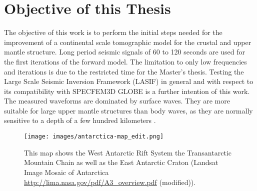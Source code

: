 \section{Objective of this Thesis} %

The objective of this work is to perform the initial steps needed for the improvement of a continental scale tomographic model for the crustal and upper mantle structure.
Long period seismic signals of 60 to 120 seconds %
are used for the first iterations of the forward model. 
The limitation to only low frequencies and %
iterations is due to the restricted time for the Master's thesis.
Testing the Large Scale Seismic Inversion Framework (LASIF) in general and with respect to its compatibility with SPECFEM3D 
GLOBE is a further intention of this work.
The measured waveforms are dominated by surface waves. 
They are more suitable for large upper mantle structures than body waves, as they are normally sensitive to a depth of a few 
hundred kilometers \citep{Morelli2004}.

 


\begin{figure}[H]
\begin{center}
\texttt{[image: images/antarctica-map\_edit.png]}
\caption[Map of Antarctica \url{http://lima.nasa.gov/pdf/A3_overview.pdf}.]
{This map shows the West Antarctic Rift System the Transantarctic Mountain Chain as well as the East Antarctic Craton 
(Landsat Image Mosaic of Antarctica \url{http://lima.nasa.gov/pdf/A3_overview.pdf} (modified)).}
\label{ant-map}
\end{center}
\end{figure}




